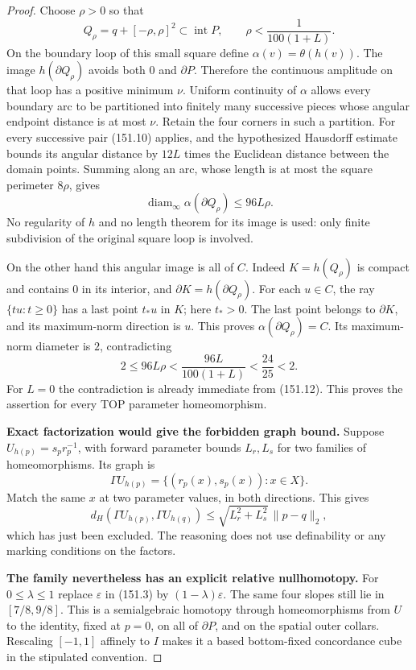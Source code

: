 \begin{proof}
Choose $\rho>0$ so that
\[
 Q_\rho=q+[-\rho,\rho]^2\subset\operatorname{int}P,\qquad
                    \rho<\frac{1}{100(1+L)}.
 \tag{151.11}
\]
On the boundary loop of this small square define
$\alpha(v)=\theta(h(v))$. The image $h(\partial Q_\rho)$ avoids both $0$ and
$\partial P$. Therefore the continuous amplitude on that loop
has a positive minimum $\nu$. Uniform continuity of $\alpha$
allows every boundary arc to be partitioned into finitely many
successive pieces whose angular endpoint distance is at most
$\nu$. Retain the four corners in such a partition.
For every successive pair (151.10) applies, and the hypothesized
Hausdorff estimate bounds its angular distance by
$12L$ times the Euclidean distance between the domain points.
Summing along an arc, whose length is at most the square perimeter
$8\rho$, gives
\[
                   \operatorname{diam}_\infty\alpha(\partial Q_\rho)
                                      \le96L\rho.
 \tag{151.12}
\]
No regularity of $h$ and no length theorem for its image is used:
only finite subdivision of the original square loop is involved.

On the other hand this angular image is all of $C$.
Indeed $K=h(Q_\rho)$ is compact and contains $0$ in its interior,
and $\partial K=h(\partial Q_\rho)$. For each $u\in C$, the ray
$\{tu:t\ge0\}$ has a last point $t_*u$ in $K$; here $t_*>0$.
The last point belongs to $\partial K$, and its maximum-norm
direction is $u$. This proves $\alpha(\partial Q_\rho)=C$.
Its maximum-norm diameter is $2$, contradicting
\[
      2\le96L\rho<
             \frac{96L}{100(1+L)}<\frac{24}{25}<2.
 \tag{151.13}
\]
For $L=0$ the contradiction is already immediate from (151.12).
This proves the assertion for every TOP parameter homeomorphism.

\textbf{Exact factorization would give the forbidden graph bound.}
Suppose $U_{h(p)}=s_pr_p^{-1}$, with forward parameter bounds
$L_r,L_s$ for two families of homeomorphisms. Its graph is
\[
      \Gamma U_{h(p)}
            =\{(r_p(x),s_p(x)):x\in X\}.
\]
Match the same $x$ at two parameter values, in both directions.
This gives
\[
 d_H(\Gamma U_{h(p)},\Gamma U_{h(q)})
                 \le\sqrt{L_r^2+L_s^2}\,\|p-q\|_2,
 \tag{151.14}
\]
which has just been excluded. The reasoning does not use
definability or any marking conditions on the factors.

\textbf{The family nevertheless has an explicit relative nullhomotopy.}
For $0\le\lambda\le1$ replace $\varepsilon$ in (151.3) by
$(1-\lambda)\varepsilon$. The same four slopes still lie in
$[7/8,9/8]$. This is a semialgebraic homotopy through
homeomorphisms from $U$ to the identity, fixed at $p=0$,
on all of $\partial P$, and on the spatial outer collars.
Rescaling $[-1,1]$ affinely to $I$ makes it a based
bottom-fixed concordance cube in the stipulated convention.


\end{proof}
